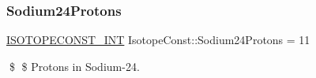 \subsubsection{\texorpdfstring{Sodium24\+Protons}{Sodium24Protons}}
{\footnotesize\ttfamily \mbox{\hyperlink{group___isotope_const-_macros_ga5f18360b3e99483a35c32d789e62621c}{I\+S\+O\+T\+O\+P\+E\+C\+O\+N\+S\+T\+\_\+\+I\+NT}} Isotope\+Const\+::\+Sodium24\+Protons = 11}

\$ \$ Protons in Sodium-\/24. 